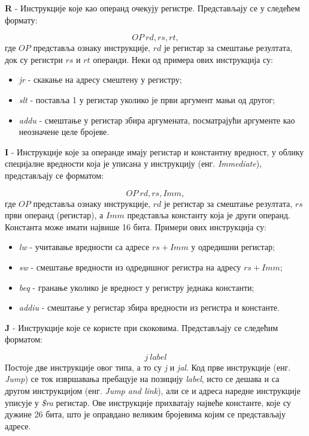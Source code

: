 \documentclass[12pt,oneside]{memoir}
\begin{document}
\textbf{R} - Инструкције које као операнд очекују регистре. Представљају се у следећем формату:

$$
OP\ rd, rs, rt,
$$
где $OP$ представља ознаку инструкције, $rd$ је регистар за смештање резултата, док су регистри $rs$ и $rt$ операнди.
Неки од примера ових инструкција су:
\begin{itemize}
	\item \textit{jr} - скакање на адресу смештену у регистру;
	\item \textit{slt} - поставља 1 у регистар уколико је први аргумент мањи од другог;
	\item \textit{addu} - смештање у регистар збира аргумената, посматрајући аргументе као неозначене целе бројеве.
\end{itemize}

\textbf{I} - Инструкције које за операнде имају регистар и константну вредност, у облику специјалне вредности која
је уписана у инструкцију (енг. \textit{Immediate}), представљају се форматом:

$$
OP\ rd, rs, Imm,
$$
где $OP$ представља ознаку инструкције, $rd$ је регистар за смештање резултата, $rs$ први операнд (регистар), а $Imm$
представља константу која је други операнд. Константа може имати највише 16 бита. Примери ових инструкција су:
\begin{itemize}
	\item \textit{lw} - учитавање вредности са адресе $rs+Imm$ у одредишни регистар;
	\item \textit{sw} - смештање вредности из одредишног регистра на адресу $rs+Imm$;
	\item \textit{beq} - гранање уколико је вредност у регистру једнака константи;
	\item \textit{addiu} - смештање у регистар збира вредности из регистра и константе.
\end{itemize}

\textbf{J} - Инструкције које се користе при скоковима. Представљају се следећим форматом:

$$
j\ label
$$
Постоје две инструкције овог типа, а то су \textit{j} и \textit{jal}. Код прве инструкције (енг. \textit{Jump}) се
ток извршавања пребацује на позицију \textit{label}, исто се дешава и са другом инструкцијом (енг. \textit{Jump and
link}), али се и адреса наредне инструкције уписује у \textit{\$ra} регистар. Ове инструкције прихватају највеће
константе, које су дужине 26 бита, што је оправдано великим бројевима којим се представљају адресе.
\end{document}
